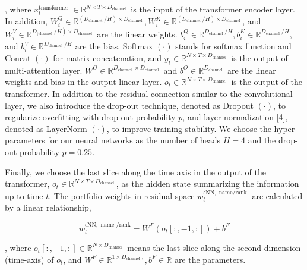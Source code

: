 \documentclass[12pt,article]{memoir}
\begin{document}
, where $x_t^{\text {transformer }} \in \mathbb{R}^{N \times T \times D_{\text {channel }}}$ is the input of the transformer encoder layer. In addition, $W_i^Q \in \mathbb{R}^{\left(D_{\text {channel }} / H\right) \times D_{\text {channel }}}, W_i^K \in \mathbb{R}^{\left(D_{\text {channel }} / H\right) \times D_{\text {channel }}}$, and $W_i^V \in \mathbb{R}^{\left.D_{\text {(channel }} / H\right) \times D_{\text {channel }}}$ are the linear weights. $b_i^Q \in \mathbb{R}^{D_{\text {channel }} / H}, b_i^K \in \mathbb{R}^{D_{\text {channel }} / H}$, and $b_i^V \in \mathbb{R}^{D_{\text {channel }} / H}$ are the bias. Softmax $(\cdot)$ stands for softmax function and Concat $(\cdot)$ for matrix concatenation, and $y_t \in \mathbb{R}^{N \times T \times D_{\text {channel }}}$ is the output of multi-attention layer. $W^O \in \mathbb{R}^{D_{\text {channel }} \times D_{\text {channel }}}$ and $b^O \in \mathbb{R}^{D_{\text {channel }}}$ are the linear weights and bias in the output linear layer. $o_t \in \mathbb{R}^{N \times T \times D_{\text {channel }}}$ is the output of the transformer. In addition to the residual connection similar to the convolutional layer, we also introduce the drop-out technique, denoted as Dropout $(\cdot)$, to regularize overfitting with drop-out probability $p$, and layer normalization [4], denoted as LayerNorm $(\cdot)$, to improve training stability. We choose the hyper-parameters for our neural networks as the number of heads $H=4$ and the drop-out probability $p=0.25$. 


Finally, we choose the last slice along the time axis in the output of the transformer, $o_t \in \mathbb{R}^{N \times T \times D_{\text {channel }}}$, as the hidden state summarizing the information up to time $t$. The portfolio weights in residual space $w_t^{\epsilon \mathrm{NN}, \text { name/rank }}$ are calculated by a linear relationship,

$$
w_t^{\epsilon \mathrm{NN}, \text { name } / \mathrm{rank}}=W^F\left(o_t[:,-1,:]\right)+b^F
$$

, where $o_t[:,-1,:] \in \mathbb{R}^{N \times D_{\text {channel }}}$ means the last slice along the second-dimension (time-axis) of $o_t$, and $W^F \in \mathbb{R}^{1 \times D_{\text {channel }},}, b^F \in \mathbb{R}$ are the parameters.
\end{document}
